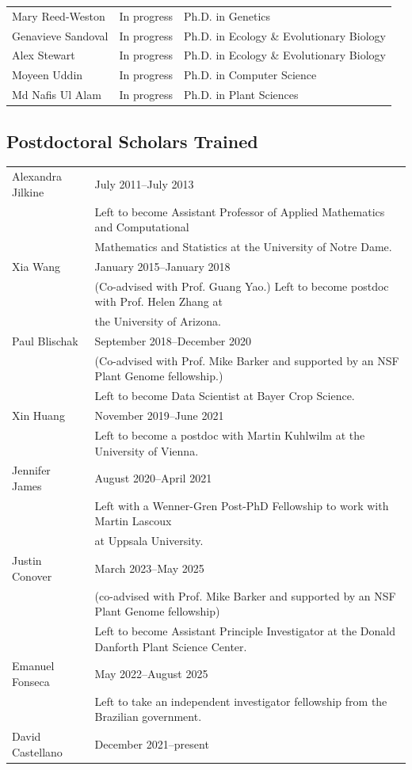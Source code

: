\documentclass[11pt]{article}
\begin{document}
\begin{longtable}[l]{l l l}
Mary Reed-Weston & In progress & Ph.D. in Genetics\\
Genavieve Sandoval & In progress & Ph.D. in Ecology \& Evolutionary Biology\\
Alex Stewart & In progress & Ph.D. in Ecology \& Evolutionary Biology\\
Moyeen Uddin & In progress & Ph.D. in Computer Science\\
Md Nafis Ul Alam & In progress & Ph.D. in Plant Sciences\\
\end{longtable}

\subsection*{Postdoctoral Scholars Trained}
\begin{longtable}[l]{l l}
Alexandra Jilkine & July 2011--July 2013\\
                  & Left to become Assistant Professor of Applied Mathematics and Computational\\
                  & Mathematics and Statistics at the University of Notre Dame.\\
Xia Wang & January 2015--January 2018\\
		& (Co-advised with Prof. Guang Yao.) Left to become postdoc with Prof. Helen Zhang at\\ &the University of Arizona.\\
Paul Blischak & September 2018--December 2020\\
		& (Co-advised with Prof. Mike Barker and supported by an NSF Plant Genome fellowship.)\\
		& Left to become Data Scientist at Bayer Crop Science.\\
Xin Huang & November 2019--June 2021\\
                & Left to become a postdoc with Martin Kuhlwilm at the University of Vienna.\\
Jennifer James & August 2020--April 2021\\
		& Left with a Wenner-Gren Post-PhD Fellowship to work with Martin Lascoux\\
		& at Uppsala University.\\
Justin Conover & March 2023--May 2025\\
& (co-advised with Prof. Mike Barker and supported by an NSF Plant Genome fellowship)\\
        & Left to become Assistant Principle Investigator at the Donald Danforth Plant Science Center.\\
Emanuel Fonseca & May 2022--August 2025\\
& Left to take an independent investigator fellowship from the Brazilian government.\\
David Castellano & December 2021--present\\
\end{longtable}
\end{document}
